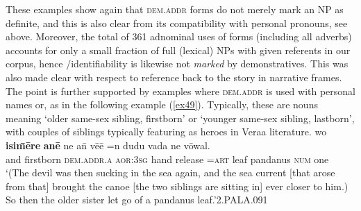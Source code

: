 \documentclass[output=paper
,modfonts
,nonflat]{langsci/langscibook}
\begin{document}
\noindent
These examples show again that \textsc{dem.addr} forms do not merely mark an NP as definite, and this is also clear from its compatibility with personal pronouns, see  above. Moreover, the total of 361 adnominal uses of  forms (including all adverbs) accounts for only a small fraction of full (lexical) NPs with given referents in our corpus, hence /identifiability is likewise not \emph{marked} by demonstratives. This was also made clear with respect to reference back to the story in narrative frames. The point is further supported by examples where \textsc{dem.addr} is used with personal names or, as in the following example (\ref{ex49}). Typically, these are nouns meaning `older same-sex sibling, firstborn' or `younger same-sex sibling, lastborn', with couples of siblings typically featuring as heroes in Vera{\textquotesingle}a literature.
\ea	\label{ex49}
\gll 	wo 	\textbf{{\textquotesingle}isi\=m\=ere} \textbf{an\=e} 		ne 		{\textquotesingle}a\=n	v\=e{\textquotesingle}\=e				=n 	dudu 	vada			ne		v\=owal.		\\
		and	firstborn	\textsc{dem.addr.a}	\textsc{aor:3sg}		hand	release		\textsc{=art}		leaf		pandanus		\textsc{num}	one		\\
\glt	`(The devil was then sucking in the sea again, and the sea current [that arose from that] brought the canoe [the two siblings are sitting in] ever closer to him.) So then the older sister let go of a pandanus leaf.'\hfill{2.PALA.091}
\z
\end{document}
